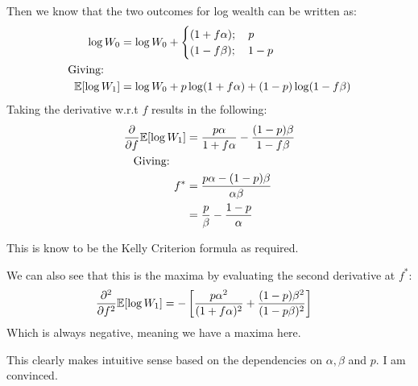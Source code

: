 \documentclass[11pt]{article}
\begin{document}
Then we know that the two outcomes for log wealth can be written as:
\begin{align}
    \log W_0 &= \log W_0 + \begin{cases}
        (1 + f\alpha);\quad p\\
        (1 - f\beta); \quad 1-p
    \end{cases}\\
    \text{Giving: }\quad &\\
    \mathbb{E}[\log W_1] &= \log W_0 + p\log (1 + f\alpha) + (1-p)\log(1 - f\beta)
\end{align}
Taking the derivative w.r.t $f$ results in the following:
\begin{align}
    \frac{\partial}{\partial f}\mathbb{E}[\log W_1] &= \frac{p\alpha}{1 + f\alpha} - \frac{(1-p)\beta}{1-f\beta} \\
    \text{Giving: }\quad&\\
    f^* &= \frac{p\alpha - (1-p)\beta}{\alpha\beta} \\
    &= \frac{p}{\beta} - \frac{1-p}{\alpha}
\end{align}

This is know to be the Kelly Criterion formula as required. 

We can also see that this is the maxima by evaluating the second derivative at $f^*$:
\begin{align}
    \frac{\partial^2}{\partial f^2}\mathbb{E}[\log W_1] &= -\left[\frac{p\alpha^2}{(1+f\alpha)^2} + \frac{(1-p)\beta^2}{(1-p\beta)^2}\right]
\end{align}
Which is always negative, meaning we have a maxima here.

This clearly makes intuitive sense based on the dependencies on $\alpha, \beta$ and $p$. I am convinced.
\end{document}
